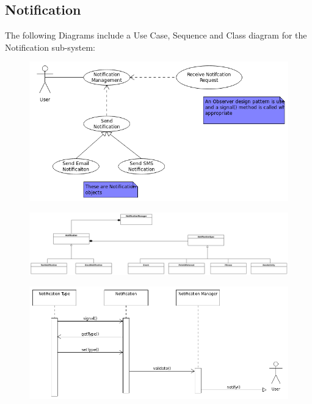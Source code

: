 \documentclass{article}
\begin{document}
	\subsection{Notification}
	The following Diagrams include a Use Case, Sequence and Class diagram for the Notification sub-system:
	\FloatBarrier	
	\begin{figure}[h]
  		\includegraphics[width=\textwidth]{Images/NotificationUseCase.png}
	\end{figure}
	\begin{figure}
  		\includegraphics[width=\textwidth]{Images/NotificationClass.png}
	\end{figure}
	\begin{figure}[h]
  		\includegraphics[width=\textwidth]{Images/NotificationSequence.png}
	\end{figure}
	\FloatBarrier	
\end{document}
